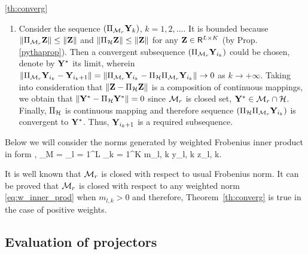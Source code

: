 \documentclass[12pt,a4paper,fleqn,leqno]{article}
\begin{document}
\begin{proof2}{\ref{th:converg}}
\begin{enumerate}
Prove that $c = 0$. Assume contrary: there exists $d > 0$ such that $\|\bfY_k - \Pi_{\calM_r} \bfY_k\| > d$, $\|\Pi_{\calM_r} \bfY_k - \bfY_{k + 1}\| > d$ for any $k = 1, 2, \ldots$. According to Proposition ~\ref{pythaprop}, the following equalities are true:
\begin{gather*}
\|\bfY_k\|^2 = \|\Pi_{\calM_r} \bfY_k\|^2 + \|\bfY_k - \Pi_{\calM_r} \bfY_k\|^2 =\\ \|\bfY_k - \Pi_{\calM_r} \bfY_k\|^2 + \|\Pi_{\calM_r} \bfY_k - \bfY_{k + 1}\|^2 + \|\bfY_{k + 1}\|^2.
\end{gather*}
Thus, $\|\bfY_{k+1}\|^2 < \|\bfY_k\|^2 - 2d^2$. Expanding the inequality by the same way further, we obtain that $\|\bfY_{k+j}\|^2 < \|\bfY_k\|^2 - 2 j d^2$ for any $j = 1, 2, \ldots$. Choose any $k$, e.g. $k = 1$, and $j = \lceil \|\bfY_k\|^2 / (2d^2) \rceil + 1$. Then $\|\bfY_{k+j}\|^2 < 0$, what is impossible.
\item Consider the sequence $(\Pi_{\mathcal{M}_r} \mathbf{Y}_k)$, $k = 1, 2, \ldots$. It is bounded because $\|\Pi_{\mathcal{M}_r} \mathbf{Z}\| \le \|\mathbf{Z}\|$ and $\|\Pi_{\mathcal{H}} \mathbf{Z}\| \le \|\mathbf{Z}\|$ for any $\mathbf{Z} \in \mathsf{R}^{L \times K}$ (by Prop. \ref{pythaprop}). Then a convergent subsequence $(\Pi_{\mathcal{M}_r} \mathbf{Y}_{i_k})$ could be chosen, denote by $\mathbf{Y}^*$ its limit, wherein $\|\Pi_{\mathcal{M}_r} \mathbf{Y}_{i_k} - \mathbf{Y}_{i_k + 1}\| = \|\Pi_{\mathcal{M}_r} \mathbf{Y}_{i_k} - \Pi_{\mathcal{H}} \Pi_{\mathcal{M}_r} \mathbf{Y}_{i_k}\| \to 0$ as $k \to + \infty$. Taking into consideration that $\|\mathbf{Z} - \Pi_{\mathcal{H}} \mathbf{Z}\|$ is a composition of continuous mappings, we obtain that $\|\mathbf{Y}^* - \Pi_{\mathcal{H}} \mathbf{Y}^*\| = 0$ since $\mathcal{M}_r$ is closed set, $\mathbf{Y}^* \in \mathcal{M}_r \cap \mathcal{H}$. Finally, $\Pi_{\mathcal{H}}$ is continuous mapping and therefore sequence $(\Pi_{\mathcal{H}} \Pi_{\mathcal{M}_r} \mathbf{Y}_{i_k})$ is convergent to $\mathbf{Y}^*$. Thus, $\mathbf{Y}_{i_k + 1}$ is a required subsequence.
\end{enumerate}
\end{proof2}

Below we will consider the norms generated by weighted Frobenius inner product in form
\be
\label{eq:w_inner_prod}
\langle\bfY, \bfZ\rangle_M = \sum_{l = 1}^L \sum_{k = 1}^K m_{l, k} y_{l, k} z_{l, k}.
\ee

It is well known that $\mathcal{M}_r$ is closed with respect to usual Frobenius norm. It can be proved that $\mathcal{M}_r$ is closed with respect to any weighted norm \eqref{eq:w_inner_prod} when $m_{l,k} > 0$ and therefore, Theorem~\ref{th:converg} is true in the case of positive weights.


\subsection{Evaluation of projectors}
\end{document}
